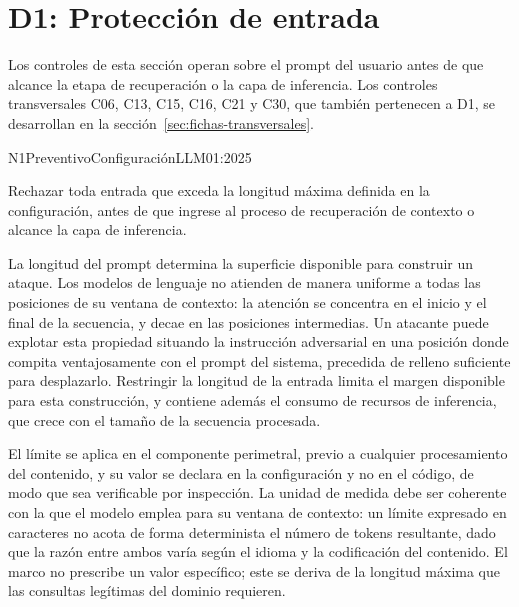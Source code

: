
\section{D1: Protección de entrada}

Los controles de esta sección operan sobre el prompt del usuario antes de que alcance la etapa de recuperación o la capa de inferencia. Los controles transversales C06, C13, C15, C16, C21 y C30, que también pertenecen a D1, se desarrollan en la sección~\ref{sec:fichas-transversales}.

  {N1}{Preventivo}{Configuración}{LLM01:2025}

Rechazar toda entrada que exceda la longitud máxima definida en la configuración, antes de que ingrese al proceso de recuperación de contexto o alcance la capa de inferencia.

La longitud del prompt determina la superficie disponible para construir un ataque. Los modelos de lenguaje no atienden de manera uniforme a todas las posiciones de su ventana de contexto: la atención se concentra en el inicio y el final de la secuencia, y decae en las posiciones intermedias. Un atacante puede explotar esta propiedad situando la instrucción adversarial en una posición donde compita ventajosamente con el prompt del sistema, precedida de relleno suficiente para desplazarlo. Restringir la longitud de la entrada limita el margen disponible para esta construcción, y contiene además el consumo de recursos de inferencia, que crece con el tamaño de la secuencia procesada.

El límite se aplica en el componente perimetral, previo a cualquier procesamiento del contenido, y su valor se declara en la configuración y no en el código, de modo que sea verificable por inspección. La unidad de medida debe ser coherente con la que el modelo emplea para su ventana de contexto: un límite expresado en caracteres no acota de forma determinista el número de tokens resultante, dado que la razón entre ambos varía según el idioma y la codificación del contenido. El marco no prescribe un valor específico; este se deriva de la longitud máxima que las consultas legítimas del dominio requieren.

